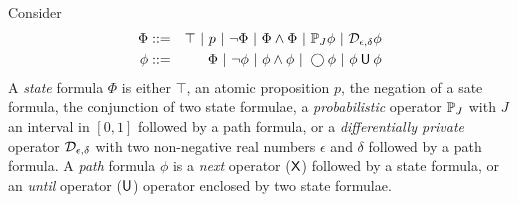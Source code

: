 
Consider
\begin{eqnarray*}
  \Phi & ::= & \top \ |\ p \ |\ \neg \Phi \ |\ \Phi \wedge \Phi \ |\
               \PJ{J} \phi \ |\ \dpriv{\epsilon}{\delta} \phi\\
  \phi & ::= & \Phi \ |\ \neg\phi  \ |\  \phi\wedge\phi  \ |\  \gX \phi \ |\ \phi \until \phi
\end{eqnarray*}
A \emph{state} formula $\Phi$ is either $\top$, an atomic proposition
$p$, the negation of a sate formula, the conjunction of two state
formulae, a \emph{probabilistic} operator $\mathbb{P}_{J}$ with $J$
an interval in $[0, 1]$ followed by a path formula, or a
\emph{differentially private} operator $\mathcal{D}_{{\epsilon}, {\delta}}$
 with two non-negative real numbers $\epsilon$ and $\delta$ followed
 by a path formula. A
\emph{path} formula $\phi$ is a \emph{next} operator ($\mathsf{X}$)
followed by a state formula, or an \emph{until} operator
($\mathbin{\mathsf{U}}$) operator enclosed by two state formulae.

